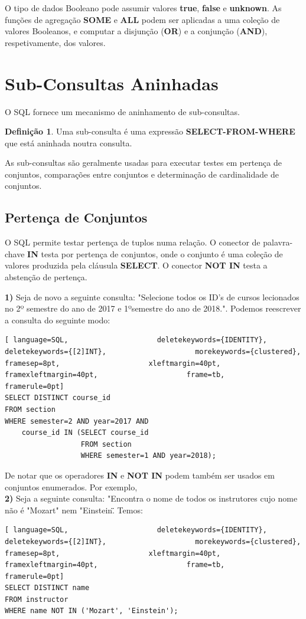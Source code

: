 \documentclass[titlepage]{book}
\theoremstyle{definition}
\newtheorem{definition}{Definição}
\begin{document}
O tipo de dados Booleano pode assumir valores \textbf{true}, \textbf{false} e \textbf{unknown}. As funções de agregação \textbf{SOME} e \textbf{ALL} podem ser aplicadas a uma coleção de valores Booleanos, e computar a disjunção (\textbf{OR}) e a conjunção (\textbf{AND}), respetivamente, dos valores.

\section{Sub-Consultas Aninhadas}
O SQL fornece um mecanismo de aninhamento de sub-consultas.
\begin{definition}
    Uma sub-consulta é uma expressão \textbf{SELECT-FROM-WHERE} que está aninhada noutra consulta.
\end{definition}
As sub-consultas são geralmente usadas para executar testes em pertença de conjuntos, comparações entre conjuntos e determinação de cardinalidade de conjuntos.

\subsection{Pertença de Conjuntos}
O SQL permite testar pertença de tuplos numa relação. O conector de palavra-chave \textbf{IN} testa por pertença de conjuntos, onde o conjunto é uma coleção de valores produzida pela cláusula \textbf{SELECT}. O conector \textbf{NOT IN} testa a abstenção de pertença.

\textbf{1)} Seja de novo a seguinte consulta: "Selecione todos os ID's de cursos lecionados no 2º semestre do ano de 2017 e 1ºsemestre do ano de 2018.". Podemos reescrever a consulta do seguinte modo:
\begin{lstlisting}[ language=SQL,                     deletekeywords={IDENTITY},                     deletekeywords={[2]INT},                     morekeywords={clustered},                     framesep=8pt,                     xleftmargin=40pt,                     framexleftmargin=40pt,                     frame=tb,                     framerule=0pt]
SELECT DISTINCT course_id
FROM section
WHERE semester=2 AND year=2017 AND
    course_id IN (SELECT course_id
                  FROM section
                  WHERE semester=1 AND year=2018);
\end{lstlisting}

De notar que os operadores \textbf{IN} e \textbf{NOT IN} podem também ser usados em conjuntos enumerados. Por exemplo, \\
\textbf{2)} Seja a seguinte consulta: "Encontra o nome de todos os instrutores cujo nome não é "Mozart" nem "Einstein\"\". Temos:
\begin{lstlisting}[ language=SQL,                     deletekeywords={IDENTITY},                     deletekeywords={[2]INT},                     morekeywords={clustered},                     framesep=8pt,                     xleftmargin=40pt,                     framexleftmargin=40pt,                     frame=tb,                     framerule=0pt]
SELECT DISTINCT name
FROM instructor
WHERE name NOT IN ('Mozart', 'Einstein');
\end{lstlisting}
\end{document}
